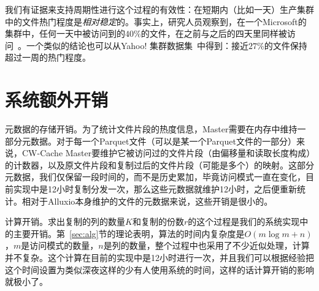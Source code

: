 \par 我们有证据来支持周期性进行这个过程的有效性：在短期内（比如一天）生产集群中的文件热门程度是\emph{相对稳定}的。事实上，研究人员观察到，在一个Microsoft的集群中，任何一天中被访问到的$40\%$的文件，在之前与之后的四天里同样被访问~\cite{ananthanarayanan2011scarlett}。一个类似的结论也可以从Yahoo! 集群数据集~\cite{yahoo!_trace}中得到：接近$27\%$的文件保持超过一周的热门程度。


\section{系统额外开销}

\par 元数据的存储开销。为了统计文件片段的热度信息，Master需要在内存中维持一部分元数据。对于每一个Parquet文件（可以是某一个Parquet文件的一部分）来说，CW-Cache Master要维护它被访问过的文件片段（由偏移量和读取长度构成）的计数器，以及原文件片段和复制过后的文件片段（可能是多个）的映射。这部分元数据，我们仅保留一段时间的，而不是历史累加，毕竟访问模式一直在变化，目前实现中是12小时复制分发一次，那么这些元数据就维护12小时，之后便重新统计。相对于Alluxio本身维护的文件的元数据来说，这些开销是很小的。

\par 计算开销。求出复制的列的数量$K$和复制的份数$r$的这个过程是我们的系统实现中的主要开销。第~\ref{sec:alg}节的理论表明，算法的时间内复杂度是$O(m\log{m} + n)$，$m$是访问模式的数量，$n$是列的数量，整个过程中也采用了不少近似处理，计算并不复杂。这个计算在目前的实现中是12小时进行一次，并且我们可以根据经验把这个时间设置为类似深夜这样的少有人使用系统的时间，这样的话计算开销的影响就极小了。
